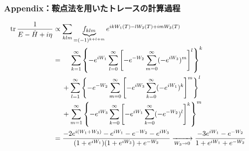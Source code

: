 \documentclass[12pt,aspectratio=169,xcolor=dvipsnames,table,dvipdfmx]{beamer}
\theoremstyle{definition}
\begin{document}
\begin{frame}
  \frametitle{Appendix：鞍点法を用いたトレースの計算過程}
  \footnotesize
  \begin{align*}
    \trace{\frac{1}{E-\hat{H}+i\eta}} & \propto \sum_{klm}\underbrace{f_{klm}}_{=(-1)^{k+l+m}}e^{ikW_1(T)-lW_2(T)+imW_3(T)}                                                                           \\
                                      & = \quad\; \sum_{k=1}^{\infty}\qty{-e^{iW_1}\sum_{l=0}^{\infty}\qty[-e^{-W_2}\sum_{m=0}^{\infty}(-e^{iW_3})^m]^l}^k                                            \\
                                      & \quad\; + \sum_{l=1}^{\infty}\qty{-e^{-W_2}\sum_{m=0}^{\infty}\qty[-e^{iW_3}\sum_{k=0}^{\infty}(-e^{iW_1})^k]^m}^l                                            \\
                                      & \quad\; + \sum_{m=1}^{\infty}\qty{-e^{iW_3}\sum_{k=0}^{\infty}\qty[-e^{iW_1}\sum_{k=0}^{\infty}(-e^{-W_2})^l]^k}^m                                            \\
                                      & = \frac{-2e^{i(W_1+W_3)}-e^{iW_1}-e^{-W_2}-e^{iW_3}}{(1+e^{iW_1})(1+e^{iW_3})+e^{-W_2}}\xrightarrow[W_3\to0]{}\frac{-3e^{iW_1}-e^{-W_2}}{1+e^{iW_1}+e^{-W_2}}
  \end{align*}
\end{frame}
\end{document}
